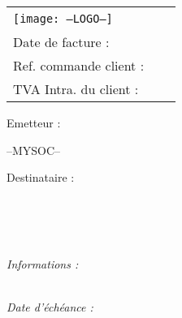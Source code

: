 \documentclass[a4paper, oneside, 10pt, french]{article}
\begin{document}
\begin{tabular}{p{9cm} p{8cm}}
    \vspace{0pt} 
    \texttt{[image: --LOGO--]}
    & 
    \vspace{0pt}
   \raggedleft
	\textcolor{violet}{\textsc{\Large \jsonTitleValue \  \jsonRefValue}}\\
	Date de facture :   \jsonDatecValue\\ \jsonPeriodValue
	Ref. commande client :  \jsonRefClientValue\\
	TVA Intra. du  client : \jsonToValueTva ~\\
\end{tabular}


\begin{minipage}[t]{0.40\textwidth}
{\small Emetteur :}\\
\begin{fminipage}
--MYSOC--
\end{fminipage}
\end{minipage}
\hspace{1cm}
\begin{minipage}[t]{0.52\textwidth}
{\small Destinataire :}

\begin{fminipage}
\textbf{\large \jsonToValueName}\\
\jsonToValueAddressStreet\\
\textsc{\jsonToValueAddressZip \ \jsonToValueAddressCity}\\
\begin{minipage}{\textwidth}
\flushright
{\tiny \jsonToValueCodeClient}
\end{minipage}
\end{fminipage}
\end{minipage}

\begin{minipage}[t]{0.60\textwidth}
{\small \it Informations :}\\
\jsonNotesValue \\
\end{minipage}
\hspace{1cm}
\begin{minipage}[t]{0.32\textwidth}
\begin{flushright}
{\it Date d'échéance : \textbf{\jsonDateechValue}}
\end{flushright}
\end{minipage}
\end{document}
